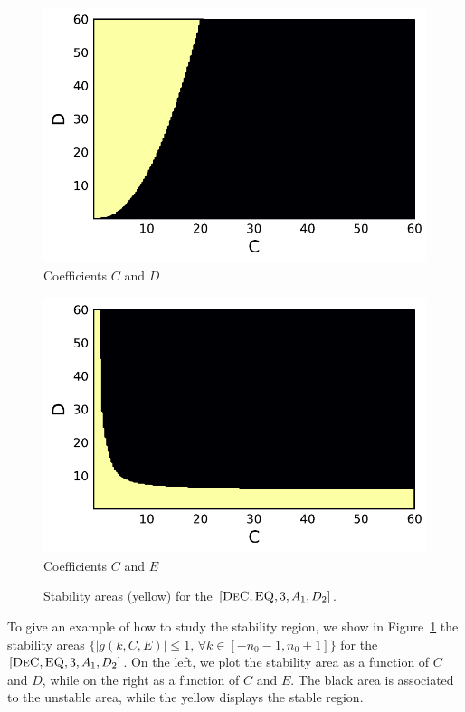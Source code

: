 \begin{example}
	\begin{figure}
		\centering
		\begin{minipage}[t]{0.42\textwidth}
			\includegraphics[width=\textwidth]{pdf/pdepics/exa_DeC3_CD.pdf}
			\centering
			Coefficients $C$ and $D$
		\end{minipage} 
		\begin{minipage}[t]{0.42\textwidth}
			\includegraphics[width=\textwidth]{pdf/pdepics/exa_DeC3_CE.pdf}
			\centering
			Coefficients $C$ and $E$
		\end{minipage}
		\caption{Stability areas (yellow) for the $[\textsc{DeC},\textsc{EQ},3, A_1,D_2]$.}
		\label{fig: exa_ImExDeC3_diff2_adv1}
	\end{figure}
	To give an example of how to study the stability region, we show in Figure~\ref{fig: exa_ImExDeC3_diff2_adv1} the stability areas $\lbrace |g(k,C,E)|\leq 1 ,\, \forall k \in [-n_0-1,n_0+1]\rbrace$ for the $[\textsc{DeC},\textsc{EQ},3, A_1,D_2]$. On the left, we plot the stability area as a function of $C$ and $D$, while on the right as a function of $C$ and $E$. The black area is associated to the unstable area, while the yellow displays the stable region.

\end{example}
